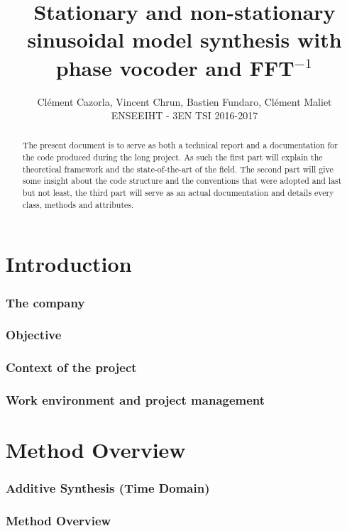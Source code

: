\documentclass[]{article}
\title{Stationary and non-stationary sinusoidal model synthesis with phase vocoder and FFT$^{-1}$}
\author{Cl\'ement Cazorla, Vincent Chrun, Bastien Fundaro, Cl\'ement Maliet \\ENSEEIHT - 3EN TSI 2016-2017}
\begin{document}
\maketitle

\begin{abstract}
The present document is to serve as both a technical report and a documentation for the code produced during the long project. As such the first part will explain the theoretical framework and the state-of-the-art of the field. The second part will give some insight about the code structure and the conventions that were adopted and last but not least, the third part will serve as an actual documentation and details every class, methods and attributes.
\end{abstract}
\newpage
\tableofcontents


\newpage
\part{Introduction}\label{sec:introduction}

\section{The company}\label{sec:the-company}
\section{Objective}\label{sec:objective}
\section{Context of the project}\label{sec:context-of-the-project}
\section{Work environment and project management}\label{sec:work-environment-and-project-management}

\newpage
\part{Method Overview}
\section{Additive Synthesis (Time Domain)}\label{sec:additive-synthesis-(time-domain)}
\section{Method Overview}\label{sec:method-overview}
\end{document}
